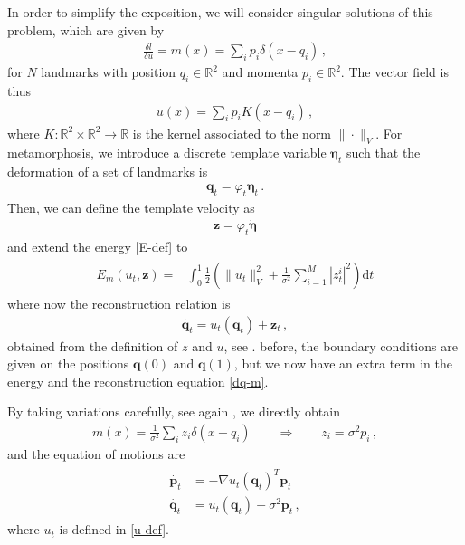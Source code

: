 \documentclass[runningheads]{llncs}
\newcommand{\half}{\frac 12}
\newcommand{\norm}[2]{\| #1 \|_{ #2 }}
\newcommand{\vnorm}[1]{\norm{ #1 }{V}}
\newcommand{\diff}[1]{\text{d} #1}
\begin{document}
In order to simplify the exposition, we will consider singular solutions of this
problem, which are given by \begin{align}
  \frac{\delta l}{\delta u} = m(x) = \sum_i p_i \delta(x-q_i)\,, 
\end{align}
for $N$ landmarks with position $q_i\in \mathbb R^2 $ and momenta $p_i \in \mathbb R^2$. 
The vector field is thus 
\begin{align}
  u(x) = \sum_i p_i K(x-q_i)\,, 
  \label{u-def}
\end{align}
where $K:\mathbb R^2\times \mathbb R^2\to \mathbb R$ is the kernel associated to
the norm $\|\cdot \|_V$.  For metamorphosis, we introduce a discrete template
variable $\boldsymbol \eta_t$ such that the deformation of a set of landmarks is
\begin{align}
  \mathbf q_t = \varphi_t \boldsymbol \eta_t\, . 
  \label{q_t}
\end{align}
Then, we can define the template velocity as 
\begin{align}
  \mathbf z = \varphi_t \dot {\boldsymbol \eta}
  \label{z_eta}
\end{align}
and extend the energy \eqref{E-def} to 
\begin{align}
  \begin{split}
    E_m(u_t, \mathbf z) = & \int_0^1
    \half  \left (\vnorm{u_t}^2 + \frac{1}{\sigma^2} \sum_{i=1}^M |z_t^i|^2\right )\diff{t}
  \end{split}
  \label{E_m-def}
\end{align}
where now the reconstruction relation is 
\begin{align}
    \dot{\mathbf q_t} = u_t (\mathbf q_t) + \mathbf z_t\, , 
    \label{dq-m}
\end{align}
obtained from the definition of $z$ and $u$, see \cite{holm2009euler}.  before,
the boundary conditions are given on the positions $\mathbf q(0)$ and $\mathbf
q(1)$, but we now have an extra term in the energy and the reconstruction
equation \eqref{dq-m}. 

By taking variations carefully, see again \cite{holm2009euler}, we directly obtain 
\begin{align}
  m(x) = \frac{1}{\sigma^2} \sum_i z_i\delta(x-q_i)\qquad \Rightarrow \qquad
  z_i = \sigma^2 p_i\, , 
\end{align}
and the equation of motions are
\begin{align}
  \begin{split}
  \dot{\mathbf p_t} &= - \nabla u_t(\mathbf q_t)^T \mathbf p_t\\ 
  \dot{\mathbf q_t} &= u_t(\mathbf q_t) +  \sigma^2\mathbf p_t \,,
  \end{split}
  \label{eq-m-classic}
\end{align}
where $u_t$ is defined in \eqref{u-def}. 
\end{document}
